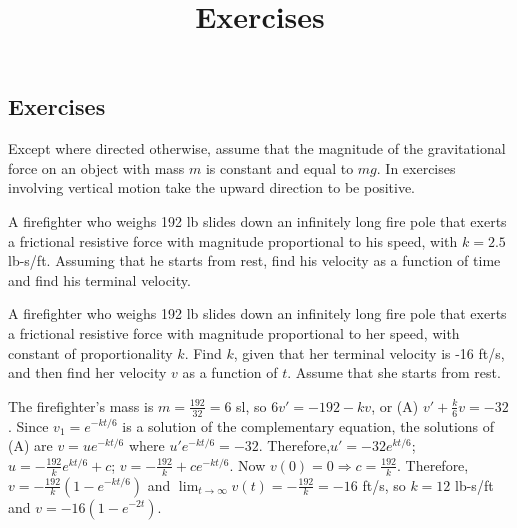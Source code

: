 \documentclass{ximera}
\title{Exercises} \license{CC BY-NC-SA 4.0}
\begin{document}
\begin{abstract}
\end{abstract}
\maketitle

\begin{onlineOnly}
\section*{Exercises}
\end{onlineOnly}


Except where directed otherwise, assume that the magnitude of the
gravitational force on an object with mass $m$ is constant and equal
to $mg$. In exercises involving vertical motion take the upward
direction to be positive.



\begin{problem}\label{exer:4.3.1}
A firefighter  who weighs 192 lb slides down an infinitely long
fire pole
that exerts a frictional resistive force with magnitude proportional
to his speed, with $k=2.5$ lb-s/ft. Assuming that he starts from
rest, find his velocity as a function of time and find his terminal
velocity.
\end{problem}

\begin{problem}\label{exer:4.3.2}
A firefighter who weighs 192 lb slides down an infinitely long
fire pole
that exerts a frictional resistive force with magnitude proportional
to her speed, with constant of proportionality $k$. Find $k$, given
that her terminal velocity is -16 ft/s, and then find her velocity
$v$ as a function of $t$. Assume that she starts from rest.

\begin{solution}
The firefighter's mass is $m=\frac{192}{32}=6$ sl, so
 $6v'=-192-kv$, or (A) $v'+\frac{k}{6}v=-32$.
Since $v_1=e^{-kt/6}$ is a solution of the complementary equation,
the solutions of (A) are $v=ue^{-kt/6}$ where $u'e^{-kt/6}=-32$.
Therefore,$u'=-32e^{kt/6}$;\ $u=-\frac{192}{k}e^{kt/6}+c$;\;
$v=-\frac{192}{k}+ce^{-kt/6}$. Now $v(0)=0\Rightarrow
c=\frac{192}{k}$. Therefore,$v=-\frac{192}{k}(1-e^{-kt/6})$
and $\lim_{t\to\infty}v(t)=-\frac{192}{k}=-16$ ft/s, so $k=12$
lb-s/ft and $v=-16(1-e^{-2t})$.
\end{solution}
\end{problem}
\end{document}
